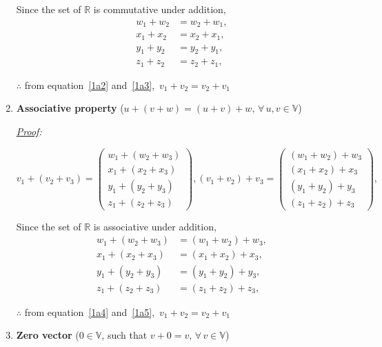 \documentclass[12pt, letterpaper]{article}
\begin{document}
\begin{enumerate}
  Since the set of $\mathbb{R}$ is commutative under addition,
  \begin{equation}
  \label{1a3}
  \begin{split}
    w_1 + w_2 &= w_2 + w_1,\\
    x_1 + x_2 &= x_2 + x_1,\\
    y_1 + y_2 &= y_2 + y_1,\\
    z_1 + z_2 &= z_2 + z_1,
  \end{split}
  \end{equation}

  $\therefore$ from equation~\ref{1a2} and~\ref{1a3},\,
  $\boxed{v_1 + v_2 = v_2 + v_1}$

\item \textbf{Associative property}
  ($u + (v + w) = (u + v) + w, \, \forall \, u, v \in \mathbb{V}$)

\textit{\underline{Proof}:}

  \begin{equation}
  \label{1a4}
  v_1 + (v_2 + v_3) = \begin{pmatrix}w_1 + (w_2 + w_3)\\x_1 + (x_2 + x_3)\\y_1 + (y_2 + y_3)\\z_1 + (z_2 + z_3)\end{pmatrix},
  (v_1 + v_2) + v_3 = \begin{pmatrix}(w_1 + w_2) + w_3\\(x_1 + x_2) + x_3\\(y_1 + y_2) + y_3\\(z_1 + z_2) + z_3\end{pmatrix},
  \end{equation}

  Since the set of $\mathbb{R}$ is associative under addition,
  \begin{equation}
  \label{1a5}
  \begin{split}
    w_1 + (w_2 + w_3) &= (w_1 + w_2) + w_3,\\
    x_1 + (x_2 + x_3) &= (x_1 + x_2) + x_3,\\
    y_1 + (y_2 + y_3) &= (y_1 + y_2) + y_3,\\
    z_1 + (z_2 + z_3) &= (z_1 + z_2) + z_3,
  \end{split}
  \end{equation}

  $\therefore$ from equation~\ref{1a4} and~\ref{1a5},\,
  $\boxed{v_1 + v_2 = v_2 + v_1}$

\item \textbf{Zero vector}
  ($0 \in \mathbb{V}$, such that $v + 0 = v, \, \forall \, v \in \mathbb{V}$)


\end{enumerate}
\end{document}

